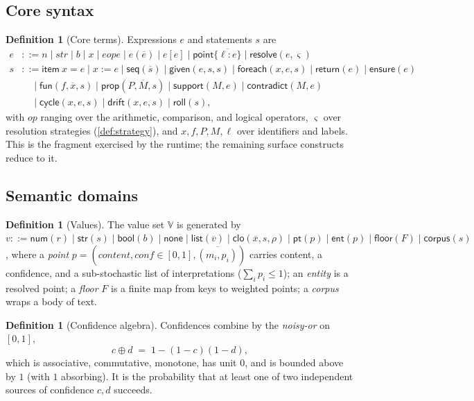 \documentclass[11pt,a4paper]{article}
\theoremstyle{plain}
\theoremstyle{definition}
\newtheorem{definition}[theorem]{Definition}
\theoremstyle{remark}
\newcommand{\Unit}{[0,1]}
\newcommand{\Val}{\mathbb{V}}
\newcommand{\nor}{\oplus}
\newcommand{\env}{\rho}
\begin{document}
\subsection{Core syntax}

\begin{definition}[Core terms]
\label{def:core}
Expressions $e$ and statements $s$ are
\begin{align*}
e &::= n \mid str \mid b \mid x \mid e\mathbin{op}e \mid e(\overline e)
       \mid e[e] \mid \mathsf{point}\{\overline{\ell:e}\}
       \mid \mathsf{resolve}(e,\varsigma)\\
s &::= \mathsf{item}\ x=e \mid x:=e \mid \mathsf{seq}(\overline s)
       \mid \mathsf{given}(e,s,s) \mid \mathsf{foreach}(x,e,s)
       \mid \mathsf{return}(e) \mid \mathsf{ensure}(e)\\
  &\quad\mid \mathsf{fun}(f,\overline x,s)
       \mid \mathsf{prop}(P,\overline M,s) \mid \mathsf{support}(M,e)
       \mid \mathsf{contradict}(M,e)\\
  &\quad\mid \mathsf{cycle}(x,e,s) \mid \mathsf{drift}(x,e,s)
       \mid \mathsf{roll}(s),
\end{align*}
with $op$ ranging over the arithmetic, comparison, and logical operators,
$\varsigma$ over resolution strategies (\cref{def:strategy}), and
$x,f,P,M,\ell$ over identifiers and labels. This is the fragment exercised by
the runtime; the remaining surface constructs reduce to it.
\end{definition}

\subsection{Semantic domains}

\begin{definition}[Values]
\label{def:values}
The value set $\Val$ is generated by
$v ::= \mathsf{num}(r)\mid\mathsf{str}(s)\mid\mathsf{bool}(b)\mid\mathsf{none}
\mid\mathsf{list}(\overline v)\mid\mathsf{clo}(\overline x,s,\env)
\mid\mathsf{pt}(p)\mid\mathsf{ent}(p)\mid\mathsf{floor}(F)
\mid\mathsf{corpus}(s)$,
where a \emph{point} $p=(\mathit{content},\mathit{conf}\in\Unit,
\overline{(m_i,p_i)})$ carries content, a confidence, and a sub-stochastic
list of interpretations ($\sum_i p_i\le1$); an \emph{entity} is a resolved
point; a \emph{floor} $F$ is a finite map from keys to weighted points; a
\emph{corpus} wraps a body of text.
\end{definition}

\begin{definition}[Confidence algebra]
\label{def:confalg}
Confidences combine by the \emph{noisy-or} on $\Unit$,
\[
c\nor d\;=\;1-(1-c)(1-d),
\]
which is associative, commutative, monotone, has unit $0$, and is bounded above
by $1$ (with $1$ absorbing). It is the probability that at least one of two
independent sources of confidence $c,d$ succeeds.
\end{definition}
\end{document}
